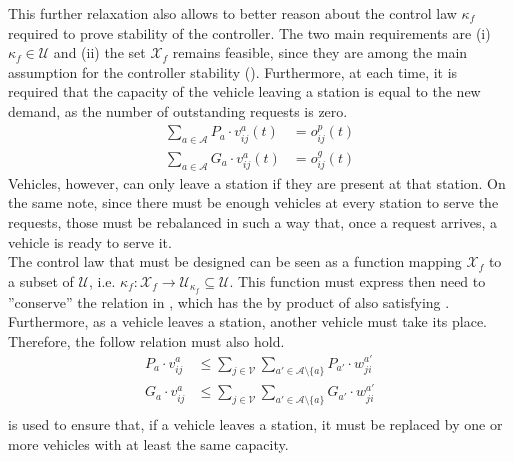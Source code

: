 This further relaxation also allows to better reason about the control law $\kappa_f$ required to prove stability of the controller. The two main requirements are (i) $\kappa_f \in \mathcal{U}$ and (ii) the set $\mathcal{X}_f$ remains feasible, since they are among the main assumption for the controller stability (). Furthermore, 
at each time, it is required that the capacity of the vehicle leaving a station is equal to the new demand, as the number of outstanding requests is zero. 
\begin{equation}
	\begin{aligned}
		\sum_{a \in \mathcal{A}}  P_a\cdot v^a_{ij}(t) &=   o^p_{ij}(t) \\
		\sum_{a \in \mathcal{A}} G_a \cdot v^a_{ij}(t) &=   o^g_{ij}(t)
	\end{aligned}
	\label{eq:no_more_than_request_f}
\end{equation}
Vehicles, however, can only leave a station if they are present at that station. On the same note, since there must be enough vehicles at every station to serve the requests, those must be rebalanced in such a way that, once a request arrives, a vehicle is ready to serve it. \\
The control law that must be designed can be seen as a function mapping $\mathcal{X}_f$ to a subset of $\mathcal{U}$, i.e. $\kappa_f:\mathcal{X}_f \rightarrow\mathcal{U}_{\kappa_f} \subseteq \mathcal{U}$. This function must express then need to ''conserve'' the relation in , which has the by product of also satisfying .\\
 Furthermore, as a vehicle leaves a station, another vehicle must take its place. Therefore, the follow relation must also hold. 
 \begin{equation}
 	\begin{aligned}
 		P_a\cdot v^a_{ij} &\leq \sum_{j \in\mathcal{V}} \sum_{a'\in \mathcal{A} \setminus \{a\}}P_{a'}\cdot	w^{a'}_{ji}\\
 		G_a\cdot v^a_{ij} &\leq \sum_{j \in\mathcal{V}} \sum_{a'\in \mathcal{A} \setminus \{a\}}G_{a'}\cdot w^{a'}_{ji}\\
 	\end{aligned}
 	\label{eq:replace_vehicle}
 \end{equation}
 is used to ensure that, if a vehicle leaves a station, it must be replaced by one or more vehicles with at least the same capacity.

